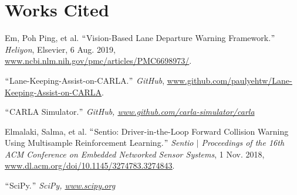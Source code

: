 \documentclass[12pt]{article}
\renewcommand{\_}{\kern-1.5pt\textunderscore\kern-1.5pt}
\begin{document}

\section{Works Cited}
\setlength{\parskip}{12.0pt}
Em, Poh Ping, et al. $``$Vision-Based Lane Departure Warning Framework.$"$  \textit{Heliyon}, Elsevier, 6 Aug. 2019, \href{http://www.ncbi.nlm.nih.gov/pmc/articles/PMC6698973/}{\textcolor[HTML]{1155CC}{\ul{www.ncbi.nlm.nih.gov/pmc/articles/PMC6698973/}}}.\par

$``$Lane-Keeping-Assist-on-CARLA.$"$  \textit{GitHub}, \href{http://www.github.com/paulyehtw/Lane-Keeping-Assist-on-CARLA}{\textcolor[HTML]{1155CC}{\ul{www.github.com/paulyehtw/Lane-Keeping-Assist-on-CARLA}}}.\par

$``$CARLA Simulator.$"$  \textit{GitHub, \href{http://www.github.com/carla-simulator/carla}{}\textcolor[HTML]{1155CC}{\ul{www.github.com/carla-simulator/carla}}}\par

Elmalaki, Salma, et al. $``$Sentio: Driver-in-the-Loop Forward Collision Warning Using Multisample Reinforcement Learning.$"$  \textit{Sentio $ \vert $  Proceedings of the 16th ACM Conference on Embedded Networked Sensor Systems}, 1 Nov. 2018, \href{http://www.dl.acm.org/doi/10.1145/3274783.3274843}{\textcolor[HTML]{1155CC}{\ul{www.dl.acm.org/doi/10.1145/3274783.3274843}}}.\par

$``$SciPy.$"$  \textit{SciPy, \href{http://www.scipy.org}{}\textcolor[HTML]{1155CC}{\ul{www.scipy.org}}}\par


\vspace{\baselineskip}

\vspace{\baselineskip}

\vspace{\baselineskip}

\vspace{\baselineskip}

\vspace{\baselineskip}

\vspace{\baselineskip}

\vspace{\baselineskip}

\vspace{\baselineskip}

\vspace{\baselineskip}

\vspace{\baselineskip}

\vspace{\baselineskip}

\vspace{\baselineskip}

\vspace{\baselineskip}

\vspace{\baselineskip}

\printbibliography
\end{document}
